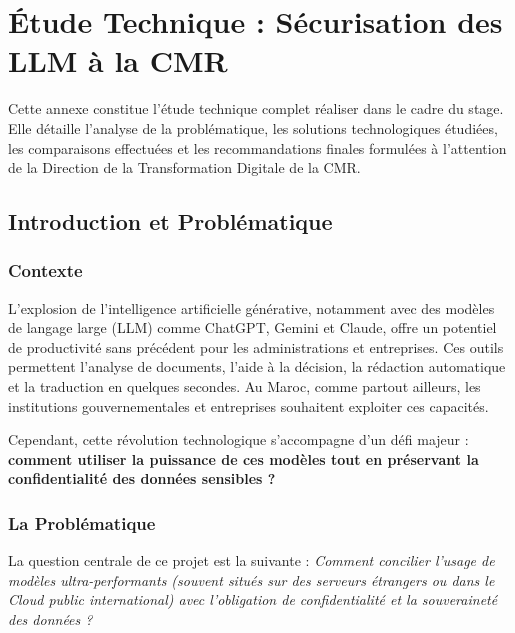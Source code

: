 \documentclass[12pt, a4paper]{report}
\begin{document}
\chapter{Étude Technique : Sécurisation des LLM à la CMR}

\begin{tcolorbox}[cmrbox, title={Note sur cette Annexe}]
Cette annexe constitue l’étude technique complet réaliser dans le cadre
du stage. Elle détaille l'analyse de la problématique, les solutions
technologiques étudiées, les comparaisons effectuées et les recommandations
finales formulées à l'attention de la Direction de la Transformation
Digitale de la CMR.
\end{tcolorbox}

\newpage

\section{Introduction et Problématique}

\subsection{Contexte}

L'explosion de l'intelligence artificielle générative, notamment avec des
modèles de langage large (LLM) comme ChatGPT, Gemini et Claude, offre un
potentiel de productivité sans précédent pour les administrations et
entreprises. Ces outils permettent l'analyse de documents, l'aide à la
décision, la rédaction automatique et la traduction en quelques secondes.
Au Maroc, comme partout ailleurs, les institutions gouvernementales et
entreprises souhaitent exploiter ces capacités.

Cependant, cette révolution technologique s'accompagne d'un défi majeur :
\textbf{comment utiliser la puissance de ces modèles tout en préservant la
confidentialité des données sensibles ?}

\subsection{La Problématique}

La question centrale de ce projet est la suivante :
\textit{Comment concilier l'usage de modèles ultra-performants (souvent
situés sur des serveurs étrangers ou dans le Cloud public international)
avec l'obligation de confidentialité et la souveraineté des données ?}
\end{document}
